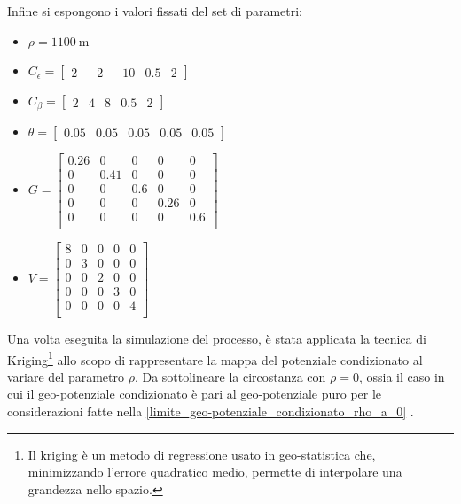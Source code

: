 Infine si espongono i valori fissati del set di parametri:
\begin{itemize}
	\item $\rho = \SI{1100}{\meter}$
	\item $C_\epsilon = \begin{bmatrix} 2 & -2 & -10 & 0.5 & 2 \end{bmatrix}$
	\item $C_\beta = \begin{bmatrix} 2 & 4 & 8 & 0.5 & 2 \end{bmatrix}$
	\item $\theta = \begin{bmatrix} 0.05 & 0.05  & 0.05 & 0.05  & 0.05  \end{bmatrix}$
	\item $G = 
	\begin{bmatrix}
		0.26 & 0 & 0 & 0 & 0 \\
		0 & 0.41 & 0 & 0 & 0 \\
		0 & 0 & 0.6 & 0 & 0 \\
		0 & 0 & 0 & 0.26 & 0 \\
		0 & 0 & 0 & 0 & 0.6 \\
	\end{bmatrix}
	$
	\item $V = 
	\begin{bmatrix}
		8 & 0 & 0 & 0 & 0 \\
		0 & 3 & 0 & 0 & 0 \\
		0 & 0 & 2 & 0 & 0 \\
		0 & 0 & 0 & 3 & 0 \\
		0 & 0 & 0 & 0 & 4 \\
	\end{bmatrix}
	$
\end{itemize}
Una volta eseguita la simulazione del processo, è stata applicata la tecnica di Kriging\footnote{Il kriging è un metodo di regressione usato in geo-statistica che, minimizzando l'errore quadratico medio, permette di interpolare una grandezza nello spazio.} allo scopo di rappresentare la mappa del potenziale condizionato al variare del parametro $\rho$. Da sottolineare la circostanza con $\rho = 0$, ossia il caso in cui il geo-potenziale condizionato è pari al geo-potenziale puro per le considerazioni fatte nella \ref{limite_geo-potenziale_condizionato_rho_a_0} .

